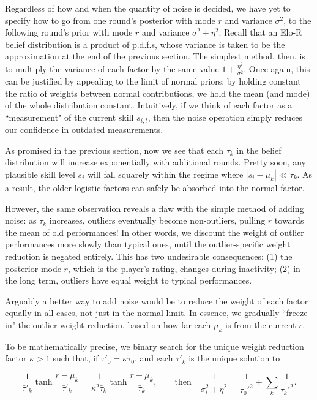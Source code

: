 \documentclass{article}
\begin{document}
Regardless of how and when the quantity of noise is decided, we have yet to specify how to go from one round's posterior with mode $r$ and variance $\sigma^2$, to the following round's prior with mode $r$ and variance $\sigma^2 + \eta^2$. Recall that an Elo-R belief distribution is a product of p.d.f.s, whose variance is taken to be the approximation at the end of the previous section. The simplest method, then, is to multiply the variance of each factor by the same value $1 + \frac{\eta^2}{\sigma^2}$. Once again, this can be justified by appealing to the limit of normal priors: by holding constant the ratio of weights between normal contributions, we hold the mean (and mode) of the whole distribution constant. Intuitively, if we think of each factor as a ``measurement" of the current skill $s_{i,t}$, then the noise operation simply reduces our confidence in outdated measurements.

As promised in the previous section, now we see that each $\tau_k$ in the belief distribution will increase exponentially with additional rounds. Pretty soon, any plausible skill level $s_i$ will fall squarely within the regime where $|s_i-\mu_k| \ll \tau_k$. As a result, the older logistic factors can safely be absorbed into the normal factor.

However, the same observation reveals a flaw with the simple method of adding noise: as $\tau_k$ increases, outliers eventually become non-outliers, pulling $r$ towards the mean of old performances! In other words, we discount the weight of outlier performances more slowly than typical ones, until the outlier-specific weight reduction is negated entirely. This has two undesirable consequences: (1) the posterior mode $r$, which is the player's rating, changes during inactivity; (2) in the long term, outliers have equal weight to typical performances.

Arguably a better way to add noise would be to reduce the weight of each factor equally in all cases, not just in the normal limit. In essence, we gradually ``freeze in" the outlier weight reduction, based on how far each $\mu_k$ is from the current $r$.

To be mathematically precise, we binary search for the unique weight reduction factor $\kappa>1$ such that, if $\tau'_0=\kappa\tau_0$, and each $\tau'_k$ is the unique solution to

\[
\frac{1}{\bar\tau'_k} \tanh \frac {r-\mu_k} {\bar\tau'_k}
= \frac{1}{\kappa^2\bar\tau_k} \tanh \frac {r-\mu_k} {\bar\tau_k},\qquad
\text{then} \quad \frac{1}{\bar\sigma_i^2 + \bar\eta^2}
= \frac{1}{\tau_0'^2} + \sum_k \frac{1}{\bar\tau_k'^2}.
\]
\end{document}

